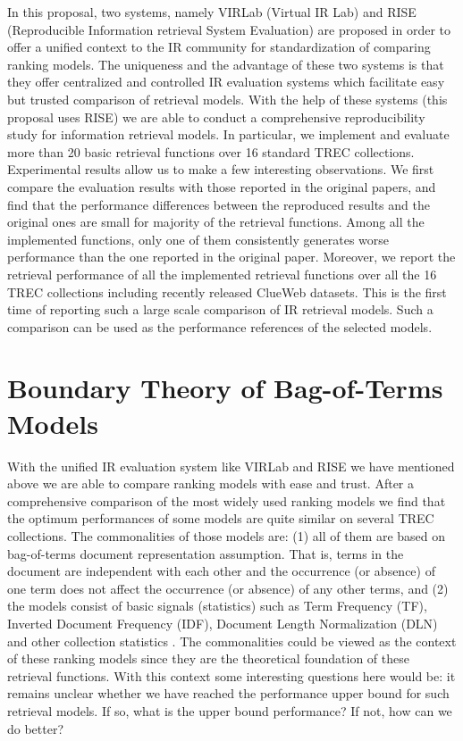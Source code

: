 In this proposal, two systems, namely VIRLab (Virtual IR Lab) 
\cite{Fang:2014:VWV:2600428.2611178} 
and RISE (Reproducible Information retrieval System Evaluation) 
\cite{Yang:2016:RSI:2970398.2970415} are proposed in order to offer 
a unified context to the IR community for standardization of comparing 
ranking models. The uniqueness and the advantage of these two systems is 
that they offer centralized and controlled IR evaluation systems which 
facilitate easy but trusted comparison of retrieval models. 
With the help of these systems (this proposal uses RISE) 
we are able to conduct a comprehensive reproducibility study for information 
retrieval models. 
In particular, we implement and evaluate more than 20 basic retrieval 
functions over 16 standard TREC collections. Experimental results allow us to 
make a few interesting observations. We first compare the evaluation results 
with those reported in the original papers, and find that the performance 
differences between the reproduced results and the original ones are small 
for majority of the retrieval functions. Among all the implemented functions, 
only one of them consistently generates worse performance than the one 
reported in the original paper. Moreover, we report the retrieval 
performance of all the implemented retrieval functions over all the 16 
TREC collections including recently released ClueWeb datasets. 
This is the first time of reporting such a large scale comparison 
of IR retrieval models. Such a comparison can be used as the performance 
references of the selected models.


\section{Boundary Theory of Bag-of-Terms Models}
With the unified IR evaluation system like VIRLab and RISE we have mentioned 
above we are able to compare ranking models with ease and trust. 
After a comprehensive comparison of the most widely used ranking models 
\cite{Yang:2016:RSI:2970398.2970415,Yang:2016:ERP:2970398.2970428} 
we find that the optimum performances of some models 
\cite{Robertson96okapiat3,Singhal:1996:PDL:243199.243206,
Zhai:2004:SSM:984321.984322,Amati:2002:PMI:582415.582416,
Fang:2005:EAA:1076034.1076116,Lv:2011:LTF:2063576.2063584,
He:2005:SDP:1076034.1076114}
are quite similar on several TREC collections. 
The commonalities of those models are: 
(1) all of them are based on bag-of-terms document representation assumption. 
That is, terms in the document are independent with each other and the 
occurrence (or absence) of one term does not affect the occurrence (or absence) 
of any other terms, and   
(2) the models consist of basic signals (statistics) such as 
Term Frequency (TF), Inverted Document Frequency (IDF), 
Document Length Normalization (DLN) and other collection statistics 
\cite{Fang:2004:FSI:1008992.1009004}. 
The commonalities could be viewed as the context of these ranking models 
since they are the theoretical foundation of these retrieval functions.
With this context some interesting questions here would be: 
it remains unclear whether we have reached the performance upper bound for 
such retrieval models. 
If so, what is the upper bound performance? If not, how can we do better?

